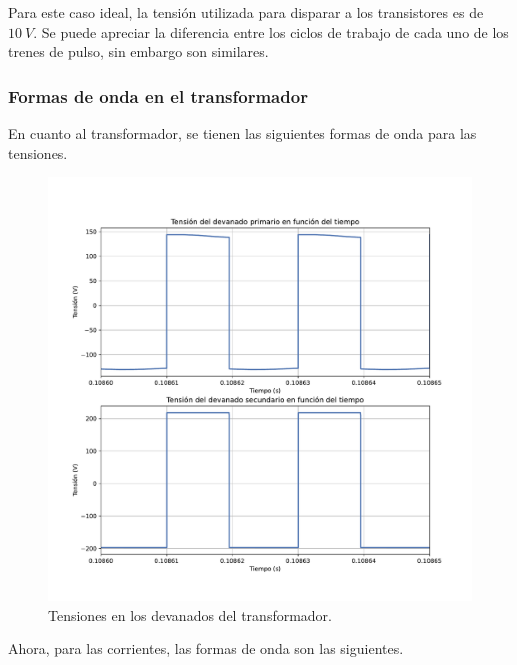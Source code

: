 Para este caso ideal, la tensión utilizada para disparar a los transistores es de $10 \ V$. Se puede apreciar la diferencia entre los ciclos de trabajo de cada uno de los trenes de pulso, sin embargo son similares.

\subsubsection{Formas de onda en el transformador}

En cuanto al transformador, se tienen las siguientes formas de onda para las tensiones.

\begin{figure}
	\centering
	\includegraphics[width=1\linewidth]{../tensiones_transformador}
	\caption{Tensiones en los devanados del transformador.}
	\label{fig:tensionestransformador}
\end{figure}


Ahora, para las corrientes, las formas de onda son las siguientes.

